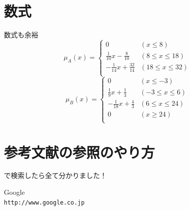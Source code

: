 \documentclass[10pt]{jarticle}
\begin{document}
\section{数式}
数式も余裕
\[
\mu_A (x) =
\left\{
  \begin{array}{lll}
    0             & (x \leq 8)\\
    \frac{1}{10}x - \frac{8}{10}  & (8 \leq x \leq 18)\\
   -\frac{1}{14}x + \frac{32}{14} & (18 \leq x \leq 32)\\
  \end{array}
\right.
\]
\[
\mu_B (x) =
\left\{
  \begin{array}{llll}
    0             & (x \leq -3)\\
    \frac{1}{9}x + \frac{1}{3}  & (-3 \leq x \leq 6)\\
   -\frac{1}{18}x + \frac{4}{3} & (6 \leq x \leq 24)\\
    0             & (x \geq 24)\\
  \end{array}
\right.
\]

\section{参考文献の参照のやり方}
\cite{google} で検索したら全て分かりました！

\begin{thebibliography}{99}
    Google\\
    \verb|http://www.google.co.jp|
\end{thebibliography}
\end{document}
